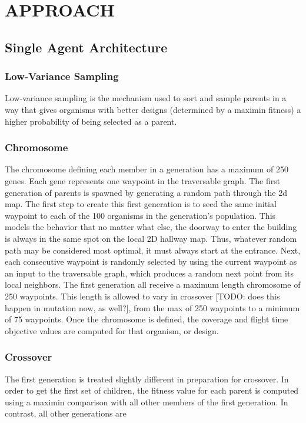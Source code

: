 \documentclass[letterpaper, 10 pt, conference]{ieeeconf}  %
\newcommand{\todo}[1]{{\color{blue}[TODO: #1]}}
\begin{document}
\section{APPROACH}\label{approach}
\subsection{Single Agent Architecture}
\subsubsection{Low-Variance Sampling}

Low-variance sampling is the mechanism used to sort and sample parents in a way that gives organisms with better designs (determined by a maximin fitness) a higher probability of being selected as a parent.

\subsubsection{Chromosome}

The chromosome defining each member in a generation has a maximum of 250 genes. Each gene represents one waypoint in the traversable graph. The first generation of parents is spawned by generating a random path through the 2d map. The first step to create this first generation is to seed the same initial waypoint to each of the 100 organisms in the generation's population. This models the behavior that no matter what else, the doorway to enter the building is always in the same spot on the local 2D hallway map. Thus, whatever random path may be considered most optimal, it must always start at the entrance. Next, each consecutive waypoint is randomly selected by using the current waypoint as an input to the traversable graph, which produces a random next point from its local neighbors. The first generation all receive a maximum length chromosome of 250 waypoints. This length is allowed to vary in crossover \todo{does this happen in mutation now, as well?}, from the max of 250 waypoints to a minimum of 75 waypoints. Once the chromosome is defined, the coverage and flight time objective values are computed for that organism, or design.

\subsubsection{Crossover}

The first generation is treated slightly different in preparation for crossover. In order to get the first set of children, the fitness value for each parent is computed using a maximin comparison with all other members of the first generation. In contrast, all other generations are
\end{document}
